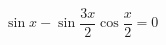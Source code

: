 \begin{ex}[type=equation]
	\begin{condition}
		$\ \sin x -\sin {\dfrac{3x}{2}}\cos{\dfrac{x}{2}} = 0$
	\end{condition}
\end{ex}
